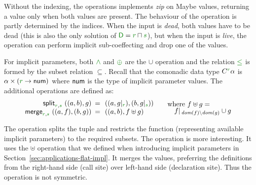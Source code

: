 \noindent
Without the indexing, the  operations implements \emph{zip} on Maybe values,
returning a value only when both values are present. The behaviour of the 
operation is partly determined by the indices. When the input is \emph{dead}, both values have
to be dead (this is also the only solution of $\cclrd{\ident{D}} =\cclrd{r}\sqcap\cclrd{s}$), but when
the input is \emph{live}, the operation can perform implicit sub-coeffecting and drop one of
the values.

\begin{example}
\label{thm:semantics-indexed-prod}

For implicit parameters, both $\czip$ and $\cpar$ are the $\cup$ operation and the relation
$\cleq$ is formed by the subset relation $\subseteq$. Recall that the comonadic data type $\ctyp{\cclrd{r}}{\alpha}$
is $\alpha \times (\cclrd{r} \rightarrow \ident{num})$ where $\textnormal{\sffamily num}$ is the type of implicit parameter values.
The additional operations are defined as:
%
\begin{equation*}
\begin{array}{rcl}
\ident{split}_{\cclrd{r}, \cclrd{s}}~((a,b), g) &\narrow{=}& ((a, \restr{g}{\cclrd{r}}), (b, \restr{g}{\cclrd{s}}))\\
\ident{merge}_{\cclrd{r}, \cclrd{s}}~((a, f), (b, g)) &\narrow{=}& ((a, b), f \uplus g)\\
\end{array}
\quad
\begin{array}{l}
\textnormal{where}~f \uplus g = \\[-0.25em]
\quad\restr{f}{\, \textit{dom}(f) \setminus \textit{dom}(g)} \cup g
\end{array}
\end{equation*}
\end{example}

\noindent
The  operation splits the tuple and restricts the function (representing available
implicit parameters) to the required subsets. The  operation is more
interesting. It uses the $\uplus$ operation that we defined when introducing implicit parameters
in Section~\ref{sec:applications-flat-impl}. It merges the values, preferring the definitions from
the right-hand side (call site) over left-hand side (declaration site). Thus the operation is not
symmetric.

